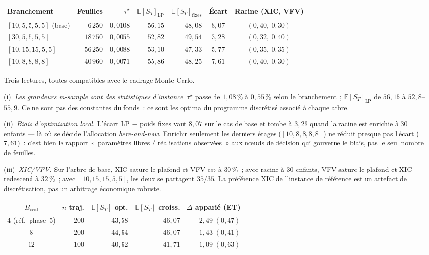 \documentclass[11pt,letterpaper]{article}
\newcommand{\E}{\mathbb{E}}
\newcommand{\taustar}{\tau^{\star}}
\theoremstyle{definition}
\begin{document}
\begin{center}
\begin{tabular}{lrrrrcc}
\toprule
Branchement & Feuilles & $\taustar$ & $\E[S_T]_{\mathrm{LP}}$ &
$\E[S_T]_{\mathrm{fixes}}$ & Écart & Racine (XIC, VFV) \\
\midrule
$[10,5,5,5,5]$ (base) & $6\,250$ & $0{,}0108$ & $56{,}15$ & $48{,}08$ &
$8{,}07$ & $(0{,}40,\ 0{,}30)$ \\
$[30,5,5,5,5]$ & $18\,750$ & $0{,}0055$ & $52{,}82$ & $49{,}54$ &
$3{,}28$ & $(0{,}32,\ 0{,}40)$ \\
$[10,15,15,5,5]$ & $56\,250$ & $0{,}0088$ & $53{,}10$ & $47{,}33$ &
$5{,}77$ & $(0{,}35,\ 0{,}35)$ \\
$[10,8,8,8,8]$ & $40\,960$ & $0{,}0071$ & $55{,}86$ & $48{,}25$ &
$7{,}61$ & $(0{,}40,\ 0{,}30)$ \\
\bottomrule
\end{tabular}
\end{center}

Trois lectures, toutes compatibles avec le cadrage Monte Carlo.

(i)~\emph{Les grandeurs in-sample sont des statistiques d'instance.}
$\taustar$ passe de $1{,}08\,\%$ à $0{,}55\,\%$ selon le branchement~;
$\E[S_T]_{\mathrm{LP}}$ de $56{,}15$ à $52{,}8$--$55{,}9$. Ce ne sont pas des
constantes du fonds~: ce sont les optima du programme discrétisé associé à
chaque arbre.

(ii)~\emph{Biais d'optimisation local.} L'écart LP $-$ poids fixes vaut
$8{,}07$ sur le cas de base et tombe à $3{,}28$ quand la racine est enrichie
à $30$ enfants --- là où se décide l'allocation \emph{here-and-now}. Enrichir
seulement les derniers étages ($[10,8,8,8,8]$) ne réduit presque pas l'écart
($7{,}61$)~: c'est bien le rapport «~paramètres libres / réalisations
observées~» aux n\oe uds de décision qui gouverne le biais, pas le seul nombre
de feuilles.

(iii)~\emph{XIC/VFV.} Sur l'arbre de base, XIC sature le plafond et VFV est à
$30\,\%$~; avec racine à $30$ enfants, VFV sature le plafond et XIC redescend
à $32\,\%$~; avec $[10,15,15,5,5]$, les deux se partagent $35$/$35$. La
préférence XIC de l'instance de référence est un artefact de discrétisation,
pas un arbitrage économique robuste.

\begin{center}
\begin{tabular}{crrrr}
\toprule
$B_{\mathrm{eval}}$ & $n$ traj. & $\E[S_T]$ opt. & $\E[S_T]$ croiss. &
$\Delta$ apparié (ET) \\
\midrule
$4$ (réf.\ phase~5) & $200$ & $43{,}58$ & $46{,}07$ & $-2{,}49$ $(0{,}47)$ \\
$8$ & $200$ & $44{,}64$ & $46{,}07$ & $-1{,}43$ $(0{,}41)$ \\
$12$ & $100$ & $40{,}62$ & $41{,}71$ & $-1{,}09$ $(0{,}63)$ \\
\bottomrule
\end{tabular}
\end{center}
\end{document}
